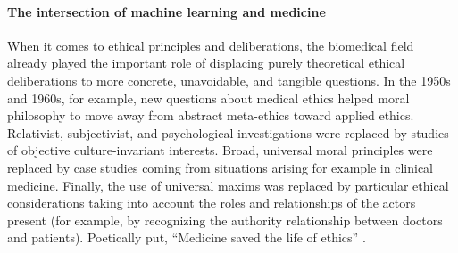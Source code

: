 \paragraph{The intersection of machine learning and medicine}
When it comes to ethical principles and deliberations, the biomedical field already played the important role of displacing purely theoretical ethical deliberations to more concrete, unavoidable, and tangible questions.
In the 1950s and 1960s, for example, new questions about medical ethics helped moral philosophy to move away from abstract meta-ethics toward applied ethics.
Relativist, subjectivist, and psychological investigations were replaced by studies of objective culture-invariant interests.
Broad, universal moral principles were replaced by case studies coming from situations arising for example in clinical medicine.
Finally, the use of universal maxims was replaced by particular ethical considerations taking into account the roles and relationships of the actors present (for example, by recognizing the authority relationship between doctors and patients).
Poetically put, ``Medicine saved the life of ethics'' \cite{Toulmin1982}.


